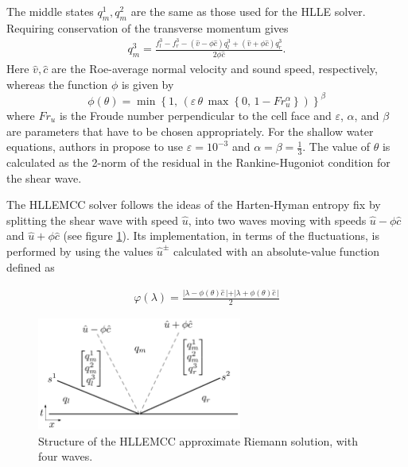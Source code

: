 \documentclass[preprint, 11pt]{article}
\begin{document}
The middle states $q^1_m, q^2_m$ are the same as those used for the HLLE solver.
Requiring conservation of the transverse momentum gives
\begin{align*}
  q^3_m = \frac{f^3_l - f^3_r - (\hat{v}-\phi\hat{c})q^3_l + (\hat{v}+\phi\hat{c})q^3_r}{2\phi\hat{c}}.
\end{align*}
Here $\hat{v}, \hat{c}$ are the Roe-average normal velocity and sound speed, respectively, whereas the function $\phi$ is given by
\begin{equation}\label{if}
\phi(\theta)=\min\left\lbrace 1,\, \left(\varepsilon\,\theta\,\max\left\lbrace0,\,1-Fr_{u}^{\alpha} \right\rbrace \right)   \right\rbrace^{\beta}
\end{equation}
where $Fr_{u}$ is the Froude number perpendicular to the cell face and $\varepsilon$, $\alpha$, and $\beta$ are parameters that have to be chosen appropriately. For the shallow water equations, authors in \cite{kemm2014note} propose to use $\varepsilon=10^{-3}$ and $\alpha=\beta=\frac{1}{3}$. The value of $\theta$ is calculated as the 2-norm of the residual in the Rankine-Hugoniot condition for the shear wave.

The HLLEMCC solver follows the ideas of the Harten-Hyman entropy fix by splitting the shear wave with speed $\hat{u}$, into two waves moving with speeds $\hat{u}-\phi\hat{c}$ and $\hat{u}+\phi\hat{c}$ (see figure \ref{HLLEMCC}). Its implementation, in terms of the fluctuations, is performed by using the values $\hat{u}^{\pm}$ calculated with an absolute-value function defined as

\begin{align*}
\varphi(\lambda)=\frac{\vert \lambda-\phi(\theta)\hat{c}\,\vert+\vert \lambda+\phi(\theta)\hat{c}\,\vert}{2}
\end{align*}

\begin{figure}
    \center
    \includegraphics[width=0.6\textwidth]{figures/hllemcc.pdf}
    \caption{Structure of the HLLEMCC approximate Riemann solution, with four waves.}
    \label{HLLEMCC}
\end{figure}
\end{document}
